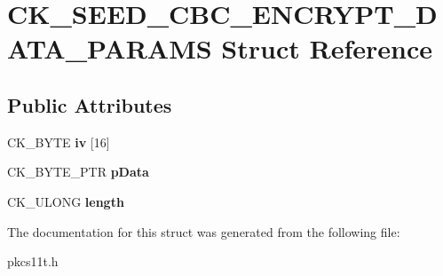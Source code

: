 \hypertarget{struct_c_k___s_e_e_d___c_b_c___e_n_c_r_y_p_t___d_a_t_a___p_a_r_a_m_s}{}\section{C\+K\+\_\+\+S\+E\+E\+D\+\_\+\+C\+B\+C\+\_\+\+E\+N\+C\+R\+Y\+P\+T\+\_\+\+D\+A\+T\+A\+\_\+\+P\+A\+R\+A\+MS Struct Reference}
\label{struct_c_k___s_e_e_d___c_b_c___e_n_c_r_y_p_t___d_a_t_a___p_a_r_a_m_s}
\subsection*{Public Attributes}
\begin{DoxyCompactItemize}
\item 
\mbox{\label{struct_c_k___s_e_e_d___c_b_c___e_n_c_r_y_p_t___d_a_t_a___p_a_r_a_m_s_a3188d7402716451340f16de71cd24f11}} 
C\+K\+\_\+\+B\+Y\+TE {\bfseries iv} \mbox{[}16\mbox{]}
\item 
\mbox{\label{struct_c_k___s_e_e_d___c_b_c___e_n_c_r_y_p_t___d_a_t_a___p_a_r_a_m_s_a331d7ad272c1ea3e1feac85ef26dbade}} 
C\+K\+\_\+\+B\+Y\+T\+E\+\_\+\+P\+TR {\bfseries p\+Data}
\item 
\mbox{\label{struct_c_k___s_e_e_d___c_b_c___e_n_c_r_y_p_t___d_a_t_a___p_a_r_a_m_s_a31654320ef995adad7d8a9cde0575fa2}} 
C\+K\+\_\+\+U\+L\+O\+NG {\bfseries length}
\end{DoxyCompactItemize}


The documentation for this struct was generated from the following file\+:\begin{DoxyCompactItemize}
\item 
pkcs11t.\+h\end{DoxyCompactItemize}
